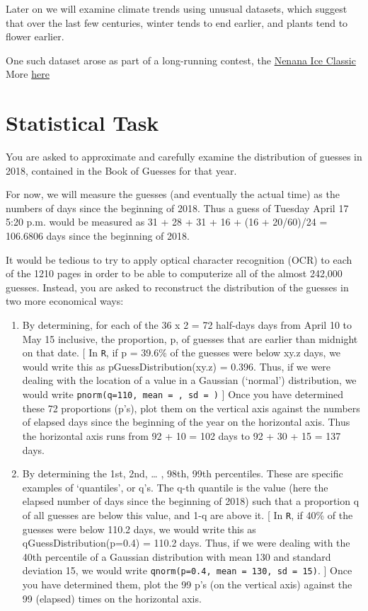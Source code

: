 \documentclass[]{book}
\begin{document}
Later on we will examine climate trends using unusual datasets, which suggest that over the last few centuries, winter tends to end earlier, and plants tend to flower earlier.

One such dataset arose as part of a long-running contest, the \href{http://www.nenanaakiceclassic.com}{Nenana Ice Classic}
More \href{http://www.john-daly.com/nenana.htm}{here}

\hypertarget{statistical-task}{%
\section{Statistical Task}\label{statistical-task}}

You are asked to approximate and carefully examine the distribution of guesses in 2018, contained in the Book of Guesses for that year.

For now, we will measure the guesses (and eventually the actual time) as the numbers of days since the beginning of 2018. Thus a guess of Tuesday April 17 5:20 p.m. would be measured as 31 + 28 + 31 + 16 + (16 + 20/60)/24 = 106.6806 days since the beginning of 2018.

It would be tedious to try to apply optical character recognition (OCR) to each of the 1210 pages in order to be able to computerize all of the almost 242,000 guesses. Instead, you are asked to reconstruct the distribution of the guesses in two more economical ways:

\begin{enumerate}
\def\labelenumi{\arabic{enumi}.}
\item
  By determining, for each of the 36 x 2 = 72 half-days days from April 10 to May 15 inclusive, the proportion, p, of guesses that are earlier than midnight on that date. {[} In \texttt{R}, if p = 39.6\% of the guesses were below xy.z days, we would write this as pGuessDistribution(xy.z) = 0.396. Thus, if we were dealing with the location of a value in a Gaussian (`normal') distribution, we would write \texttt{pnorm(q=110,\ mean\ =\ ,\ sd\ =\ )} {]} Once you have determined these 72 proportions (p's), plot them on the vertical axis against the numbers of elapsed days since the beginning of the year on the horizontal axis. Thus the horizontal axis runs from 92 + 10 = 102 days to 92 + 30 + 15 = 137 days.
\item
  By determining the 1st, 2nd, \ldots{} , 98th, 99th percentiles. These are specific examples of `quantiles', or q's. The q-th quantile is the value (here the elapsed number of days since the beginning of 2018) such that a proportion q of all guesses are below this value, and 1-q are above it. {[} In \texttt{R}, if 40\% of the guesses were below 110.2 days, we would write this as qGuessDistribution(p=0.4) = 110.2 days. Thus, if we were dealing with the 40th percentile of a Gaussian distribution with mean 130 and standard deviation 15, we would write \texttt{qnorm(p=0.4,\ mean\ =\ 130,\ sd\ =\ 15)}. {]} Once you have determined them, plot the 99 p's (on the vertical axis) against the 99 (elapsed) times on the horizontal axis.
\end{enumerate}
\end{document}
